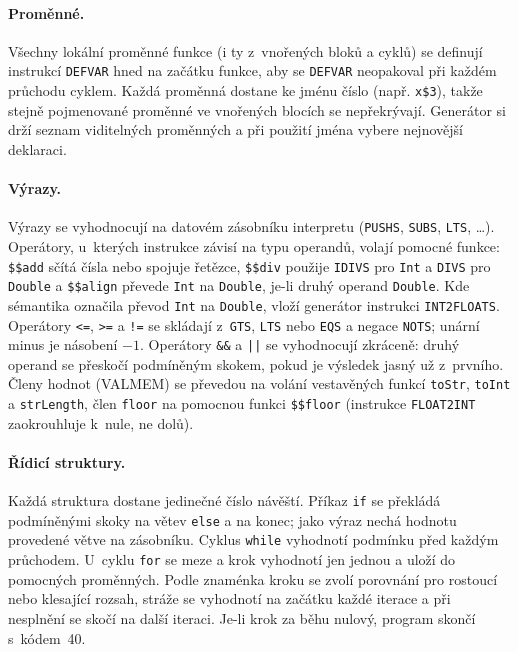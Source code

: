 \documentclass[11pt,a4paper]{article}
\begin{document}
\paragraph{Proměnné.}
Všechny lokální proměnné funkce (i ty z~vnořených bloků a cyklů) se
definují instrukcí \texttt{DEFVAR} hned na začátku funkce, aby se
\texttt{DEFVAR} neopakoval při každém průchodu cyklem. Každá proměnná
dostane ke jménu číslo (např. \texttt{x\$3}), takže stejně pojmenované
proměnné ve vnořených blocích se nepřekrývají. Generátor si drží seznam
viditelných proměnných a při použití jména vybere nejnovější deklaraci.

\paragraph{Výrazy.}
Výrazy se vyhodnocují na datovém zásobníku interpretu (\texttt{PUSHS},
\texttt{SUBS}, \texttt{LTS}, \dots). Operátory, u~kterých instrukce
závisí na typu operandů, volají pomocné funkce: \texttt{\$\$add} sčítá
čísla nebo spojuje řetězce, \texttt{\$\$div} použije \texttt{IDIVS} pro
\texttt{Int} a \texttt{DIVS} pro \texttt{Double} a \texttt{\$\$align}
převede \texttt{Int} na \texttt{Double}, je-li druhý operand
\texttt{Double}. Kde sémantika označila převod \texttt{Int} na
\texttt{Double}, vloží generátor instrukci \texttt{INT2FLOATS}.
Operátory \texttt{<=}, \texttt{>=} a \texttt{!=} se skládají
z~\texttt{GTS}, \texttt{LTS} nebo \texttt{EQS} a negace \texttt{NOTS};
unární minus je násobení $-1$. Operátory \texttt{\&\&} a \texttt{||} se
vyhodnocují zkráceně: druhý operand se přeskočí podmíněným skokem, pokud
je výsledek jasný už z~prvního. Členy hodnot (VALMEM) se převedou na
volání vestavěných funkcí \texttt{toStr}, \texttt{toInt}
a \texttt{strLength}, člen \texttt{floor} na pomocnou funkci
\texttt{\$\$floor} (instrukce \texttt{FLOAT2INT} zaokrouhluje k~nule,
ne dolů).

\paragraph{Řídicí struktury.}
Každá struktura dostane jedinečné číslo návěští. Příkaz \texttt{if} se
překládá podmíněnými skoky na větev \texttt{else} a na konec; jako výraz
nechá hodnotu provedené větve na zásobníku. Cyklus \texttt{while}
vyhodnotí podmínku před každým průchodem. U~cyklu \texttt{for} se meze
a krok vyhodnotí jen jednou a uloží do pomocných proměnných. Podle
znaménka kroku se zvolí porovnání pro rostoucí nebo klesající rozsah,
stráže se vyhodnotí na začátku každé iterace a při nesplnění se skočí na
další iteraci. Je-li krok za běhu nulový, program skončí s~kódem~40.
\end{document}
